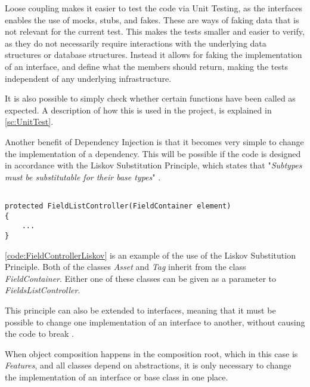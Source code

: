 Loose coupling makes it easier to test the code via Unit Testing, as the interfaces enables the use of mocks, stubs, and fakes. These are ways of faking data that is not relevant for the current test. This makes the tests smaller and easier to verify, as they do not necessarily require interactions with the underlying data structures or database structures. Instead it allows for faking the implementation of an interface, and define what the members should return, making the tests independent of any underlying infrastructure.
\par
It is also possible to simply check whether certain functions have been called as expected. A description of how this is used in the project, is explained in \autoref{sc:UnitTest}.
\par
Another benefit of Dependency Injection is that it becomes very simple to change the implementation of a dependency. This will be possible if the code is designed in accordance with the Liskov Substitution Principle, which states that "\textit{Subtypes must be substitutable for their base types}" \citep{AgilePPP}. 

\begin{listing}[H]
\begin{verbatim}

protected FieldListController(FieldContainer element)
{
    ...
}

\end{verbatim}
\label{code:FieldControllerLiskov}
\end{listing}

\autoref{code:FieldControllerLiskov} is an example of the use of the Liskov Substitution Principle. Both of the classes \textit{Asset} and \textit{Tag} inherit from the class \textit{FieldContainer}. Either one of these classes can be given as a parameter to \textit{FieldsListController}. 
\par
This principle can also be extended to interfaces, meaning that it must be possible to change one implementation of an interface to another, without causing the code to break \citep{seemann2019dependency}. 
\par
When object composition happens in the composition root, which in this case is \textit{Features}, and all classes depend on abstractions, it is only necessary to change the implementation of an interface or base class in one place.

